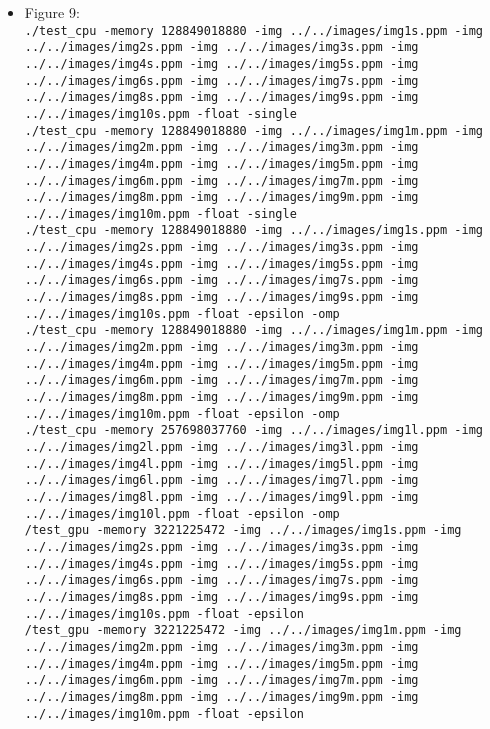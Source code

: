 \documentclass[format=acmsmall,review=false, screen=true]{acmart}
\begin{document}
\begin{itemize}
\item Figure 9:\\
\small{\texttt{./test\_cpu -memory 128849018880 -img ../../images/img1s.ppm -img ../../images/img2s.ppm -img ../../images/img3s.ppm -img ../../images/img4s.ppm -img ../../images/img5s.ppm -img ../../images/img6s.ppm -img ../../images/img7s.ppm -img ../../images/img8s.ppm -img ../../images/img9s.ppm -img ../../images/img10s.ppm -float -single}\\
\texttt{./test\_cpu -memory 128849018880 -img ../../images/img1m.ppm -img ../../images/img2m.ppm -img ../../images/img3m.ppm -img ../../images/img4m.ppm -img ../../images/img5m.ppm -img ../../images/img6m.ppm -img ../../images/img7m.ppm -img ../../images/img8m.ppm -img ../../images/img9m.ppm -img ../../images/img10m.ppm -float -single}\\
\texttt{./test\_cpu -memory 128849018880 -img ../../images/img1s.ppm -img ../../images/img2s.ppm -img ../../images/img3s.ppm -img ../../images/img4s.ppm -img ../../images/img5s.ppm -img ../../images/img6s.ppm -img ../../images/img7s.ppm -img ../../images/img8s.ppm -img ../../images/img9s.ppm -img ../../images/img10s.ppm -float -epsilon -omp}\\
\texttt{./test\_cpu -memory 128849018880 -img ../../images/img1m.ppm -img ../../images/img2m.ppm -img ../../images/img3m.ppm -img ../../images/img4m.ppm -img ../../images/img5m.ppm -img ../../images/img6m.ppm -img ../../images/img7m.ppm -img ../../images/img8m.ppm -img ../../images/img9m.ppm -img ../../images/img10m.ppm -float -epsilon -omp}\\
\texttt{./test\_cpu -memory 257698037760 -img ../../images/img1l.ppm -img ../../images/img2l.ppm -img ../../images/img3l.ppm -img ../../images/img4l.ppm -img ../../images/img5l.ppm -img ../../images/img6l.ppm -img ../../images/img7l.ppm -img ../../images/img8l.ppm -img ../../images/img9l.ppm -img ../../images/img10l.ppm -float -epsilon -omp}\\
\texttt{/test\_gpu -memory 3221225472 -img ../../images/img1s.ppm -img ../../images/img2s.ppm -img ../../images/img3s.ppm -img ../../images/img4s.ppm -img ../../images/img5s.ppm -img ../../images/img6s.ppm -img ../../images/img7s.ppm -img ../../images/img8s.ppm -img ../../images/img9s.ppm -img ../../images/img10s.ppm -float -epsilon}\\
\texttt{/test\_gpu -memory 3221225472 -img ../../images/img1m.ppm -img ../../images/img2m.ppm -img ../../images/img3m.ppm -img ../../images/img4m.ppm -img ../../images/img5m.ppm -img ../../images/img6m.ppm -img ../../images/img7m.ppm -img ../../images/img8m.ppm -img ../../images/img9m.ppm -img ../../images/img10m.ppm -float -epsilon}\\
}
\end{itemize}
\end{document}
